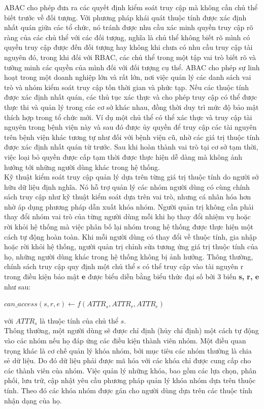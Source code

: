 ABAC cho phép đưa ra các quyết định kiểm soát truy cập mà không cần chủ thể
biết trước về đối tượng. Với phương pháp khái quát thuộc tính được xác định nhất quán
giữa các tổ chức, nó tránh được nhu cầu xác minh quyền truy cập rõ ràng của các chủ
thể với các đối tượng, nghĩa là chủ thể không biết rõ mình có quyền truy cập được đến
đối tượng hay không khi chưa có nhu cầu truy cập tài nguyên đó, trong khi đối với
RBAC, các chủ thể trong một tập vai trò biết rõ và tường minh các quyền của mình đối
với đối tượng cụ thể. ABAC cho phép sự linh hoạt trong một doanh nghiệp lớn và rất
lớn, nơi việc quản lý các danh sách vai trò và nhóm kiểm soát truy cập tốn thời gian và
phức tạp. Nếu các thuộc tính được xác định nhất quán, các thủ tục xác thực và cho phép
truy cập có thể được thực thi và quản lý trong các cơ sở khác nhau, đồng thời duy trì
mức độ bảo mật thích hợp trong tổ chức mới. Ví dụ một chủ thể có thể xác thực và truy
cập tài nguyên trong bệnh viện này và sau đó được ủy quyền để truy cập các tài nguyên
trên bệnh viện khác tương tự như đối với bệnh viện cũ, nhờ các giá trị thuộc tính được
xác định nhất quán từ trước. Sau khi hoàn thành vai trò tại cơ sở tạm thời, việc loại bỏ quyền được cấp tạm thời được thực hiện dễ dàng mà không ảnh hưởng tới những người
dùng khác trong hệ thống. \\

Kỹ thuật kiểm soát truy cập quản lý dựa trên từng giá trị thuộc tính do người sở
hữu dữ liệu định nghĩa. Nó hỗ trợ quản lý các nhóm người dùng có cùng chính sách truy
cập như kỹ thuật kiểm soát dựa trên vai trò, nhưng cá nhân hóa hơn nhờ áp dụng phương
pháp dẫn xuất khóa nhóm. Người quản trị không cần phải thay đổi nhóm vai trò của từng
người dùng mỗi khi họ thay đổi nhiệm vụ hoặc rời khỏi hệ thống mà việc phân bố lại
nhóm trong hệ thống được thực hiện một cách tự động hoàn toàn. Khi mỗi người dùng
có thay đổi về thuộc tính, gia nhập hoặc rời khỏi hệ thống, người quản trị chỉnh sửa
tương ứng giá trị thuộc tính của họ, những người dùng khác trong hệ thống không bị ảnh
hưởng. Thông thường, chính sách truy cập quy định một chủ thể s có thể truy cập vào
tài nguyên r trong điều kiện bảo mật \textbf{e} được biểu diễn bằng biểu thức đại số bởi 3 biến \textbf{s, r, e} như sau:
\begin{center}
$can\_access(s, r, e) \leftarrow f(ATTR_{s},ATTR_{r}, ATTR_{e})$ \cite{yuan2005attributed}
\end{center} với $ATTR_{s}$ là thuộc tính của chủ thể $s$. \\


Thông thường, một người dùng sẽ được chỉ định (hủy chỉ định) một cách tự động
vào các nhóm nếu họ đáp ứng các điều kiện thành viên nhóm. Một điều quan trọng khác
là cơ chế quản lý khóa nhóm, bởi mục tiêu các nhóm thường là chia sẻ dữ liệu. Do đó
dữ liệu phải được mã hóa với các khóa chỉ được cung cấp cho các thành viên của nhóm.
Việc quản lý những khóa, bao gồm các lựa chọn, phân phối, lưu trữ, cập nhật yêu cầu
phương pháp quản lý khóa nhóm dựa trên thuộc tính. Theo đó các khóa nhóm được gán
cho người dùng dựa trên các thuộc tính nhận dạng của họ. \\

